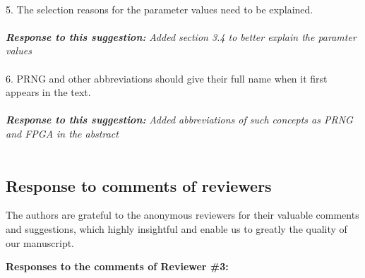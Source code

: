 \documentclass{report}
\begin{document}
\\
5. The
selection reasons for the parameter values need to be explained.
\\
\\
\textbf{\textit{Response to this suggestion:}}
\textit{Added section 3.4 to better explain the paramter values}
\\
\\
6. PRNG and other
abbreviations should give their full name when it first appears in the text.
\\
\\
\textbf{\textit{Response to this suggestion:}}
\textit{Added abbreviations of such concepts as PRNG and FPGA in the abstract}
\\
\\



\newpage
\begin{center}
\section*{Response to comments of reviewers}
\end{center}

\vspace{0.5cm} %

The authors are grateful to the anonymous reviewers for their valuable comments and suggestions, which highly insightful and enable us to greatly the quality of our manuscript.   

\vspace{0.5cm} %

\textbf{Responses to the comments of Reviewer \#3:} \\
\end{document}
